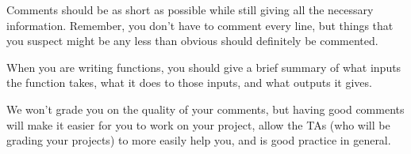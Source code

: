 \documentclass[10pt]{report}
\begin{document}
\par 
Comments should be as short as possible while still giving all the necessary information. Remember, you don't have to comment every line, but things that you suspect might be any less than obvious should definitely be commented.

\par
When you are writing functions, you should give a brief summary of what inputs the function takes, what it does to those inputs, and what outputs it gives. 

\par 
We won't grade you on the quality of your comments, but having good comments will make it easier for you to work on your project, allow the TAs (who will be grading your projects) to more easily help you, and is good practice in general.
 
\end{document}
